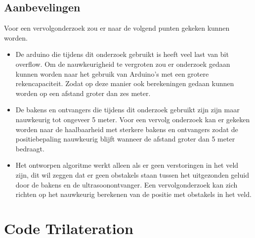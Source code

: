 \documentclass{article}
\begin{document}
\subsection{Aanbevelingen} 
 Voor een vervolgonderzoek zou er naar de volgend punten gekeken kunnen worden.
 \begin{itemize}
 	\item De arduino die tijdens dit onderzoek gebruikt is heeft veel last van bit overflow. Om de nauwkeurigheid te vergroten zou er onderzoek gedaan kunnen worden naar het gebruik van Arduino's met een grotere rekencapaciteit. Zodat op deze manier ook berekeningen gedaan kunnen worden op een afstand groter dan zes meter. 
 	\item De bakens en ontvangers die tijdens dit onderzoek gebruikt zijn zijn maar nauwkeurig tot ongeveer 5 meter. Voor een vervolg onderzoek kan er gekeken worden naar de haalbaarheid met sterkere bakens en ontvangers zodat de positiebepaling nauwkeurig blijft wanneer de afstand groter dan 5 meter bedraagt. 
 	\item Het ontworpen algoritme werkt alleen als er geen verstoringen in het veld zijn, dit wil zeggen dat er geen obstakels staan tussen het uitgezonden geluid door de bakens en de ultrasoonontvanger. Een vervolgonderzoek kan zich richten op het nauwkeurig berekenen van de positie met obstakels in het veld.  
 \end{itemize}
\newpage



\newpage
\appendix
{}
\section{Code Trilateration}
\label{code}
    \fontsize{8pt}{8pt}\selectfont

    \fontsize{10pt}{12pt}\selectfont
\newpage
\end{document}
